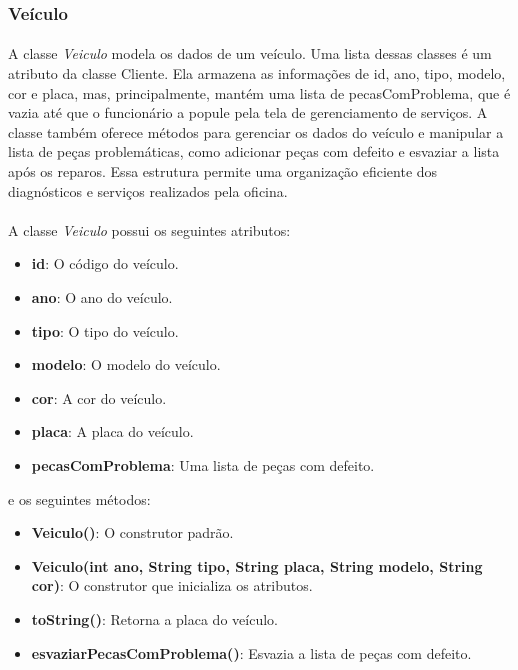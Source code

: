 \documentclass[a4paper,12pt]{article}
\begin{document}
\subsubsection{Veículo}
\paragraph{}
A classe \textit{Veiculo} modela os dados de um veículo. Uma lista dessas classes é um atributo da classe Cliente. Ela armazena as informações de id, ano, tipo, modelo, cor e placa, mas, principalmente, mantém uma lista de pecasComProblema, que é vazia até que o funcionário a popule pela tela de gerenciamento de serviços. A classe também oferece métodos para gerenciar os dados do veículo e manipular a lista de peças problemáticas, como adicionar peças com defeito e esvaziar a lista após os reparos. Essa estrutura permite uma organização eficiente dos diagnósticos e serviços realizados pela oficina.

\paragraph{}
A classe \textit{Veiculo} possui os seguintes atributos:
\begin{itemize}[noitemsep]
    \item \textbf{id}: O código do veículo.
    \item \textbf{ano}: O ano do veículo.
    \item \textbf{tipo}: O tipo do veículo.
    \item \textbf{modelo}: O modelo do veículo.
    \item \textbf{cor}: A cor do veículo.
    \item \textbf{placa}: A placa do veículo.
    \item \textbf{pecasComProblema}: Uma lista de peças com defeito.
\end{itemize}
\noindent e os seguintes métodos:
\begin{itemize}[noitemsep]
    \item \textbf{Veiculo()}: O construtor padrão.
    \item \textbf{Veiculo(int ano, String tipo, String placa, String modelo, String cor)}: O construtor que inicializa os atributos.
    \item \textbf{toString()}: Retorna a placa do veículo.
    \item \textbf{esvaziarPecasComProblema()}: Esvazia a lista de peças com defeito.
\end{itemize}
\end{document}
